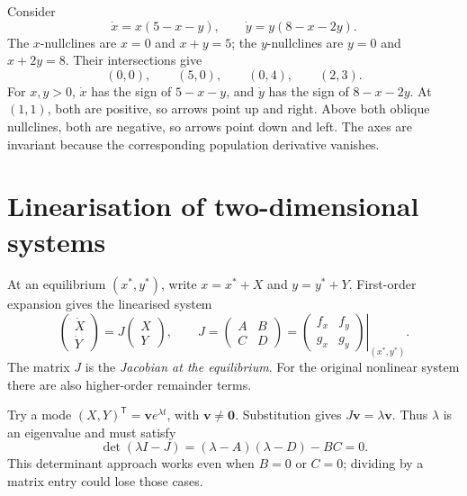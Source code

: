 
\begin{example}\label{ex:applied-competition}
Consider
\[
\dot x=x(5-x-y),\qquad\dot y=y(8-x-2y).
\]
The $x$-nullclines are $x=0$ and $x+y=5$; the $y$-nullclines are $y=0$
and $x+2y=8$. Their intersections give
\[
(0,0),\qquad(5,0),\qquad(0,4),\qquad(2,3).
\]
For $x,y>0$, $\dot x$ has the sign of $5-x-y$, and $\dot y$ has the sign
of $8-x-2y$. At $(1,1)$, both are positive, so arrows point up and right.
Above both oblique nullclines, both are negative, so arrows point down and left.
The axes are invariant because the corresponding population derivative vanishes.
\end{example}


\section{Linearisation of two-dimensional systems}
At an equilibrium $(x^*,y^*)$, write $x=x^*+X$ and $y=y^*+Y$.
First-order expansion gives the linearised system
\[
\begin{pmatrix}\dot X\\\dot Y\end{pmatrix}
=J\begin{pmatrix}X\\Y\end{pmatrix},\qquad
J=\begin{pmatrix}A&B\\C&D\end{pmatrix}
=\left.\begin{pmatrix}f_x&f_y\\g_x&g_y\end{pmatrix}\right|_{(x^*,y^*)}.
\]
The matrix $J$ is the \emph{Jacobian at the equilibrium}. For the original
nonlinear system there are also higher-order remainder terms.

Try a mode $(X,Y)^{\mathsf T}=\mathbf v e^{\lambda t}$, with
$\mathbf v\ne\mathbf0$. Substitution gives $J\mathbf v=\lambda\mathbf v$.
Thus $\lambda$ is an eigenvalue and must satisfy
\begin{equation}\label{eq:applied-characteristic}
\det(\lambda I-J)=(\lambda-A)(\lambda-D)-BC=0.
\end{equation}
This determinant approach works even when $B=0$ or $C=0$; dividing by a
matrix entry could lose those cases.

